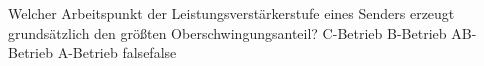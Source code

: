     {Welcher Arbeitspunkt der Leistungsverstärkerstufe eines Senders erzeugt grundsätzlich den größten Oberschwingungsanteil?}
    {C-Betrieb}
    {B-Betrieb}
    {AB-Betrieb}
    {A-Betrieb}
    {false}{false}